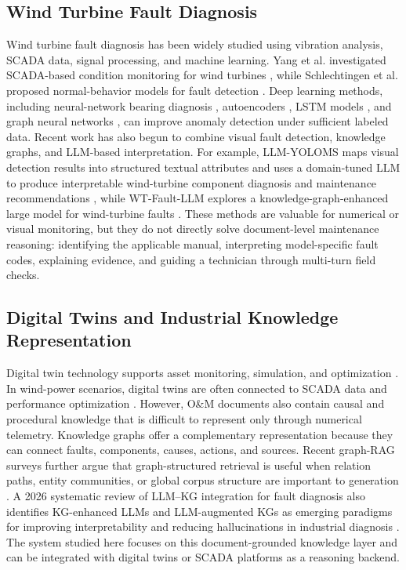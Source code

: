 \documentclass[lettersize,journal]{IEEEtran}
\begin{document}
\subsection{Wind Turbine Fault Diagnosis}
Wind turbine fault diagnosis has been widely studied using vibration analysis, SCADA data, signal processing, and machine learning. Yang et al. investigated SCADA-based condition monitoring for wind turbines \cite{yang2009wind}, while Schlechtingen et al. proposed normal-behavior models for fault detection \cite{schlechtingen2013wind}. Deep learning methods, including neural-network bearing diagnosis \cite{bangalore2015artificial}, autoencoders \cite{shao2018novel}, LSTM models \cite{chen2020fault}, and graph neural networks \cite{li2022graph}, can improve anomaly detection under sufficient labeled data. Recent work has also begun to combine visual fault detection, knowledge graphs, and LLM-based interpretation. For example, LLM-YOLOMS maps visual detection results into structured textual attributes and uses a domain-tuned LLM to produce interpretable wind-turbine component diagnosis and maintenance recommendations \cite{li2025llmyoloms}, while WT-Fault-LLM explores a knowledge-graph-enhanced large model for wind-turbine faults \cite{wang2025wtfaultllm}. These methods are valuable for numerical or visual monitoring, but they do not directly solve document-level maintenance reasoning: identifying the applicable manual, interpreting model-specific fault codes, explaining evidence, and guiding a technician through multi-turn field checks.

\subsection{Digital Twins and Industrial Knowledge Representation}
Digital twin technology supports asset monitoring, simulation, and optimization \cite{grieves2017digital,tao2019digital,barricelli2019survey}. In wind-power scenarios, digital twins are often connected to SCADA data and performance optimization \cite{liu2021digital}. However, O\&M documents also contain causal and procedural knowledge that is difficult to represent only through numerical telemetry. Knowledge graphs offer a complementary representation because they can connect faults, components, causes, actions, and sources. Recent graph-RAG surveys further argue that graph-structured retrieval is useful when relation paths, entity communities, or global corpus structure are important to generation \cite{peng2024graphragSurvey}. A 2026 systematic review of LLM--KG integration for fault diagnosis also identifies KG-enhanced LLMs and LLM-augmented KGs as emerging paradigms for improving interpretability and reducing hallucinations in industrial diagnosis \cite{razaq2026llmkgfaultreview}. The system studied here focuses on this document-grounded knowledge layer and can be integrated with digital twins or SCADA platforms as a reasoning backend.
\end{document}
